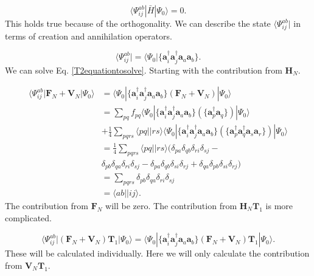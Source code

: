\documentclass[a4paper,norsk,11pt,twoside]{report}
\begin{document}
\begin{equation}
\langle \Psi_{ij}^{ab} | \bar{H} | \Psi_0 \rangle = 0 . \label{T2equationtosolve}
\end{equation}
This holds true because of the orthogonality. We can describe the state $\langle \Psi_{ij}^{ab}|$ in terms of creation and annihilation operators.

\begin{equation}
\langle \Psi_{ij}^{ab}| = \langle \Psi_0 | \{ \textbf{a}^{\dag}_i \textbf{a}^{\dag}_j \textbf{a}_a \textbf{a}_b \} .
\end{equation}
We can solve Eq. \eqref{T2equationtosolve}. Starting with the contribution from $\textbf{H}_N$. 

\begin{align}
\langle \Psi_{ij}^{ab} | \textbf{F}_N + \textbf{V}_N | \Psi_0 \rangle & = 
\langle \Psi_{0} | \{\textbf{a}^{\dag}_i \textbf{a}^{\dag}_j \textbf{a}_a \textbf{a}_b\} \left( \textbf{F}_N + \textbf{V}_N \right) | \Psi_0 \rangle \nonumber \\ &
= \sum_{pq} f_{pq} \langle \Psi_{0} | \{\textbf{a}^{\dag}_i \textbf{a}^{\dag}_j \textbf{a}_a \textbf{a}_b\} \left( \{ \textbf{a}^{\dag}_p \textbf{a}_q \} \right) | \Psi_0 \rangle \nonumber \\ & 
+ \frac{1}{4} \sum_{pqrs} \langle pq || rs \rangle \langle \Psi_{0} | \{\textbf{a}^{\dag}_i \textbf{a}^{\dag}_j \textbf{a}_a \textbf{a}_b\} \left( \{ \textbf{a}^{\dag}_p \textbf{a}^{\dag}_q 
\textbf{a}_s \textbf{a}_r\} \right) | \Psi_0 \rangle \nonumber \\ &
= \frac{1}{4} \sum_{pqrs} \langle pq || rs \rangle
( \delta_{pa} \delta_{qb} \delta_{ri} \delta_{sj} - \nonumber \\ &
\delta_{pb} \delta_{qa} \delta_{ri} \delta_{sj} - 
\delta_{pa} \delta_{qb} \delta_{si} \delta_{rj} +
\delta_{qa} \delta_{pb} \delta_{si} \delta_{rj} ) \nonumber \\ &
= \sum_{pqrs} \delta_{pb} \delta_{qa} \delta_{ri} \delta_{sj} \nonumber \\ &
= \langle ab || ij \rangle .
\end{align}
The contribution from $\textbf{F}_N$ will be zero. The contribution from $\textbf{H}_N \textbf{T}_1$ is more complicated.

\begin{equation}
\langle \Psi_{ij}^{ab} | (\textbf{F}_N + \textbf{V}_N)\textbf{T}_1 | \Psi_0 \rangle = \langle \Psi_{0} | \{\textbf{a}^{\dag}_i \textbf{a}^{\dag}_j \textbf{a}_a \textbf{a}_b\} \left( \textbf{F}_N + \textbf{V}_N \right) \textbf{T}_1 | \Psi_0 \rangle .
\end{equation}
These will be calculated individually. Here we will only calculate the contribution from $\textbf{V}_N \textbf{T}_1$.
\end{document}
